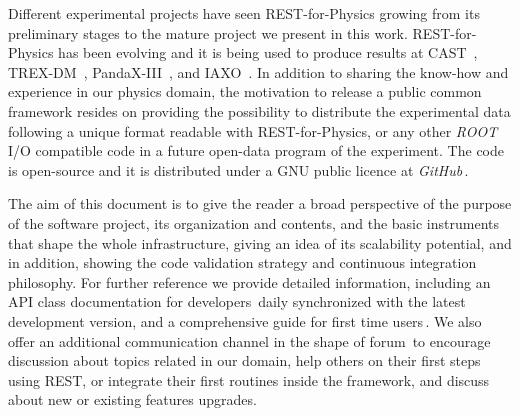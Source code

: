 Different experimental projects have seen REST-for-Physics growing from its preliminary stages to the mature project we present in this work. REST-for-Physics has been evolving and it is being used to produce results at CAST~\cite{Anastassopoulos:2017ftl}, TREX-DM~\cite{trexdm_bckmodel}, PandaX-III~\cite{pandaxiii_cdr,Lin:2018mpd,Galan:2019ake}, and IAXO~\cite{Armengaud:2019uso}. In addition to sharing the know-how and experience in our physics domain, the motivation to release a public common framework resides on providing the possibility to distribute the experimental data following a unique format readable with REST-for-Physics, or any other \emph{ROOT} I/O compatible code in a future open-data program of the experiment. The code is open-source and it is distributed under a GNU public licence at \emph{GitHub}\,\cite{REST_Git}.

The aim of this document is to give the reader a broad perspective of the purpose of the software project, its organization and contents, and the basic instruments that shape the whole infrastructure, giving an idea of its scalability potential, and in addition, showing the code validation strategy and continuous integration philosophy. For further reference we provide detailed information, including an API class documentation for developers\,\cite{REST_API} daily synchronized with the latest development version, and a comprehensive guide for first time users\,\cite{REST_user_guide}. We also offer an additional communication channel in the shape of forum\,\cite{REST_forum} to encourage discussion about topics related in our domain, help others on their first steps using REST, or integrate their first routines inside the framework, and discuss about new or existing features upgrades.






